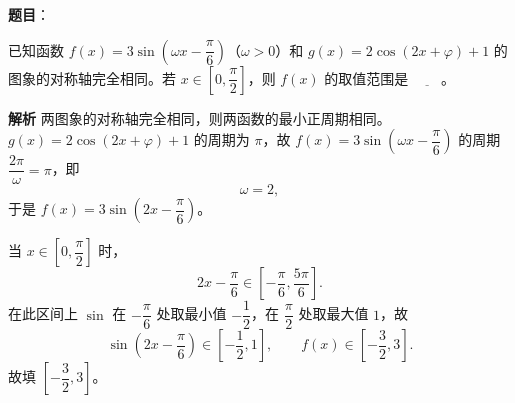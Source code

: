 \begin{answer}

\textbf{题目}：

已知函数 $f(x)=3\sin\left(\omega x-\dfrac{\pi}{6}\right)$（$\omega>0$）和 $g(x)=2\cos(2x+\varphi)+1$ 的图象的对称轴完全相同。若 $x\in\left[0,\dfrac{\pi}{2}\right]$，则 $f(x)$ 的取值范围是 $\underline{\qquad}$。

\textbf{解析}
两图象的对称轴完全相同，则两函数的最小正周期相同。$g(x)=2\cos(2x+\varphi)+1$ 的周期为 $\pi$，故 $f(x)=3\sin\left(\omega x-\dfrac\pi6\right)$ 的周期 $\dfrac{2\pi}{\omega}=\pi$，即
\nopagebreak[4]
\[\omega=2,\]
于是 $f(x)=3\sin\left(2x-\dfrac\pi6\right)$。

当 $x\in\left[0,\dfrac\pi2\right]$ 时，
\nopagebreak[4]
\[2x-\frac\pi6\in\left[-\frac\pi6,\frac{5\pi}6\right].\]
在此区间上 $\sin$ 在 $-\dfrac\pi6$ 处取最小值 $-\dfrac12$，在 $\dfrac\pi2$ 处取最大值 $1$，故
\nopagebreak[4]
\[\sin\left(2x-\frac\pi6\right)\in\left[-\frac12,1\right],\qquad
f(x)\in\left[-\frac32,3\right].\]
故填 $\left[-\dfrac32,3\right]$。


\end{answer}
